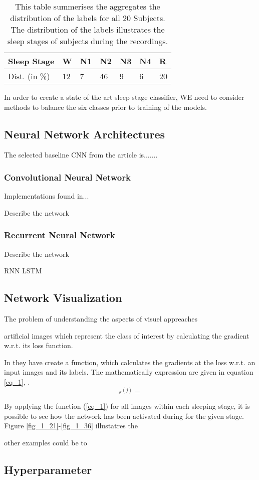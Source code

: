 \begin{table}[th!]
\begin{tabular}{l|llllll}
Sleep Stage & W & N1 &  N2& N3 & N4 & R \\\hline
Dist. (in \%) &12 &7&46&9&6&20
\end{tabular}
\caption{This table summerises the aggregates the distribution of the labels for all 20 Subjects. The distribution of the labels illustrates the sleep stages of subjects during the recordings.}
\label{tab_class_balance}
\end{table}

In order to create a state of the art sleep stage classifier, WE need to consider methods to balance the six classes prior to training of the models.

\subsection{Neural Network Architectures}

The selected baseline CNN from the article is.......






\subsubsection{Convolutional Neural Network}

Implementations found in...

Describe the network

\subsubsection{Recurrent Neural Network}

Describe the network

RNN LSTM

\subsection{Network Visualization}

The problem of understanding the aspects of visuel appreaches


artificial images which represent the class of interest by calculating the gradient w.r.t. its loss function. 



In \cite{main_ar} they have create a function, which calculates the gradients at the loss w.r.t. an input images and its labels. The mathematically expression are given in equation \ref{eq_1}, \cite{main_ar}.
\begin{equation}
s^{\left(j\right)} = 
\label{eq_1}
\end{equation}


By applying the function (\ref{eq_1}) for all images within each sleeping stage, it is possible to see how the network has been activated during for the given stage. Figure \ref{fig_1_21}-\ref{fig_1_36} illustatres the


other examples could be to 




\subsection{Hyperparameter}
